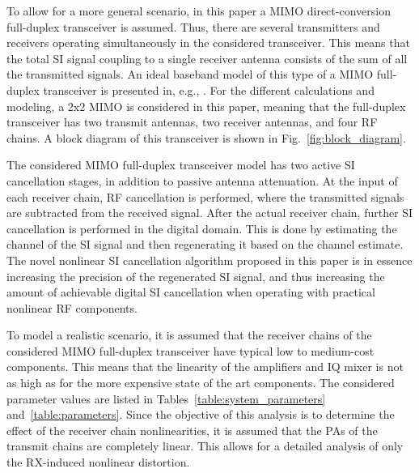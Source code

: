 \documentclass[conference,twoside,letterpaper,10pt]{IEEEtran}
\begin{document}
To allow for a more general scenario, in this paper a MIMO direct-conversion full-duplex transceiver is assumed. Thus, there are several transmitters and receivers operating simultaneously in the considered transceiver. This means that the total SI signal coupling to a single receiver antenna consists of the sum of all the transmitted signals. An ideal baseband model of this type of a MIMO full-duplex transceiver is presented in, e.g., \cite{Riihonen12}. For the different calculations and modeling, a 2x2 MIMO is considered in this paper, meaning that the full-duplex transceiver has two transmit antennas, two receiver antennas, and four RF chains. A block diagram of this transceiver is shown in Fig.~\ref{fig:block_diagram}.

The considered MIMO full-duplex transceiver model has two active SI cancellation stages, in addition to passive antenna attenuation. At the input of each receiver chain, RF cancellation is performed, where the transmitted signals are subtracted from the received signal. After the actual receiver chain, further SI cancellation is performed in the digital domain. This is done by estimating the channel of the SI signal and then regenerating it based on the channel estimate. The novel nonlinear SI cancellation algorithm proposed in this paper is in essence increasing the precision of the regenerated SI signal, and thus increasing the amount of achievable digital SI cancellation when operating with practical nonlinear RF components.

To model a realistic scenario, it is assumed that the receiver chains of the considered MIMO full-duplex transceiver have typical low to medium-cost components. This means that the linearity of the amplifiers and IQ mixer is not as high as for the more expensive state of the art components. The considered parameter values are listed in Tables~\ref{table:system_parameters} and~\ref{table:parameters}. Since the objective of this analysis is to determine the effect of the receiver chain nonlinearities, it is assumed that the PAs of the transmit chains are completely linear. This allows for a detailed analysis of only the RX-induced nonlinear distortion.
\end{document}
